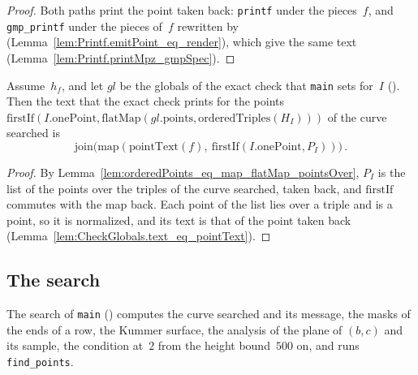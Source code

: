 \begin{proof}
  \leanok
  Both paths print the point taken back: \texttt{printf} under the pieces~$f$, and
  \texttt{gmp\_printf} under the pieces of~$f$ rewritten by 
  (Lemma~\ref{lem:Printf.emitPoint_eq_render}), which give the same text
  (Lemma~\ref{lem:Printf.printMpz_gmpSpec}).
\end{proof}

\begin{lemma}\label{lem:textOf_firstIf_flatMap_orderedTriples}
  \leanok
  Assume~$h_f$, and let $\mathit{gl}$ be the globals of the exact check that \texttt{main} sets
  for~$I$ (). Then the text that the exact check prints for the
  points $\mathrm{firstIf}(I.\mathrm{onePoint}, \mathrm{flatMap}(\mathit{gl}.\mathrm{points},
  \mathrm{orderedTriples}(H_I)))$ of the curve searched is
  \[ \mathrm{join}\bigl(\mathrm{map}(\mathrm{pointText}(f),\
     \mathrm{firstIf}(I.\mathrm{onePoint}, P_I))\bigr)\,. \]
\end{lemma}

\begin{proof}
  \leanok
  By Lemma~\ref{lem:orderedPoints_eq_map_flatMap_pointsOver}, $P_I$ is the list of the points over
  the triples of the curve searched, taken back, and $\mathrm{firstIf}$ commutes with the map back.
  Each point of the list lies over a triple and is a point, so it is normalized, and its text is
  that of the point taken back (Lemma~\ref{lem:CheckGlobals.text_eq_pointText}).
\end{proof}

\subsection{The search}\label{sec:theoremsSearch}

The search of \texttt{main} () computes the curve searched and its
message, the masks of the ends of a row, the Kummer surface, the analysis of the plane of $(b, c)$
and its sample, the condition at~$2$ from the height bound~$500$ on, and runs \texttt{find\_points}.

